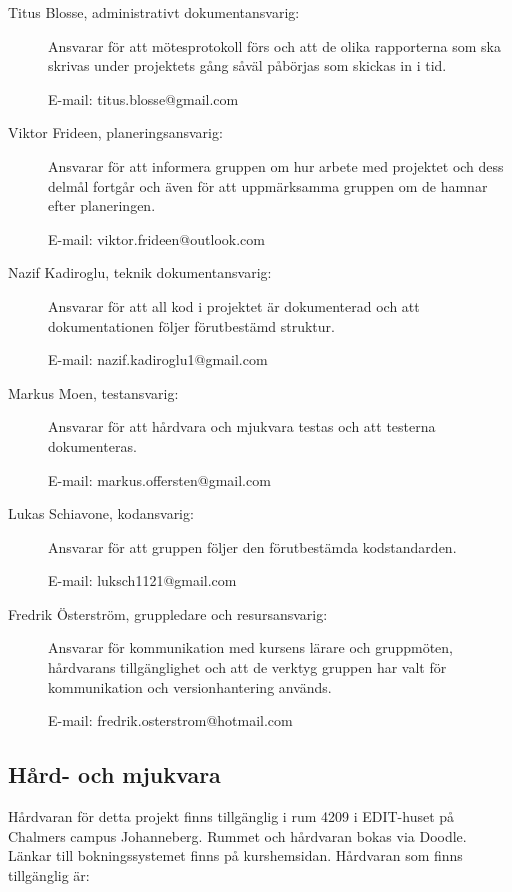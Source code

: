 \documentclass[a4paper]{article}
\begin{document}
\begin{description}
    \item[Titus Blosse, administrativt dokumentansvarig:] Ansvarar för att mötesprotokoll förs och att de olika rapporterna som ska skrivas under projektets gång såväl påbörjas som skickas in i tid.

    E-mail: titus.blosse@gmail.com

    \item[Viktor Frideen, planeringsansvarig:] Ansvarar för att informera gruppen om hur arbete med projektet och dess delmål fortgår och även för att uppmärksamma gruppen om de hamnar efter planeringen.

    E-mail: viktor.frideen@outlook.com

    \item[Nazif Kadiroglu, teknik dokumentansvarig:] Ansvarar för att all kod i projektet är dokumenterad och att dokumentationen följer förutbestämd struktur. 

    E-mail: nazif.kadiroglu1@gmail.com

    \item[Markus Moen, testansvarig:] Ansvarar för att hårdvara och mjukvara testas och att testerna dokumenteras.

    E-mail: markus.offersten@gmail.com

    \item[Lukas Schiavone, kodansvarig:] Ansvarar för att gruppen följer den förutbestämda kodstandarden.

    E-mail: luksch1121@gmail.com

    \item[Fredrik Österström, gruppledare och resursansvarig:] Ansvarar för kommunikation med kursens lärare och gruppmöten, hårdvarans tillgänglighet och att de verktyg gruppen har valt för kommunikation och versionhantering används.

    E-mail: fredrik.osterstrom@hotmail.com
\end{description}

\subsection{Hård- och mjukvara}

Hårdvaran för detta projekt finns tillgänglig i rum 4209 i EDIT-huset på Chalmers campus Johanneberg. Rummet och hårdvaran bokas via Doodle. Länkar till bokningssystemet finns på kurshemsidan. Hårdvaran som finns tillgänglig är:
\end{document}
